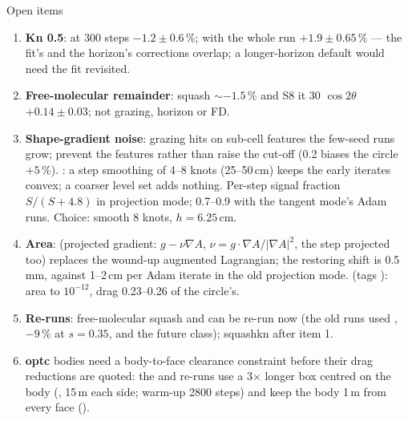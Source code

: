 \documentclass[10pt,aspectratio=169]{beamer}
\begin{document}
\begin{frame}{Open items}
\footnotesize
\begin{enumerate}
\item \textbf{Kn 0.5}:  at 300 steps $-1.2\pm0.6\,\%$; with the whole run $+1.9\pm0.65\,\%$ --- the fit's and the
  horizon's corrections overlap; a longer-horizon default would need the fit revisited.
\item \textbf{Free-molecular remainder}: squash $\sim-1.5\,\%$ and S8 it 30 $\cos2\theta$ $+0.14\pm0.03$; not grazing, horizon or FD.
\item \textbf{Shape-gradient noise}: grazing hits on sub-cell features the few-seed runs grow; prevent the features
  rather than raise the cut-off (0.2 biases the circle $+5\,\%$).  : a step smoothing of 4--8 knots
  (25--50\,cm) keeps the early iterates convex; a coarser level set adds nothing.  Per-step signal fraction $S/(S+4.8)$
  in projection mode; 0.7--0.9 with the tangent mode's Adam runs.  Choice: smooth 8 knots, $h = 6.25$\,cm.
\item \textbf{Area}:  (projected gradient: $g - \nu\nabla A$, $\nu = g\cdot\nabla A/|\nabla A|^2$, the step
  projected too) replaces the wound-up augmented Lagrangian; the restoring shift is 0.5\,mm, against 1--2\,cm per Adam
  iterate in the old projection mode.   (tags ): area to $10^{-12}$, drag 0.23--0.26 of the circle's.
\item \textbf{Re-runs}: free-molecular squash and  can be re-run now (the old runs used
  , $-9\,\%$ at $s = 0.35$, and  the future class); squashkn after item 1.
\item \textbf{optc} bodies need a body-to-face clearance constraint before their drag reductions are quoted:
  the  and  re-runs use a 3$\times$ longer box centred on the body (,
  15\,m each side; warm-up 2800 steps) and keep the body 1\,m from every face ().
\end{enumerate}
\end{frame}
\end{document}
